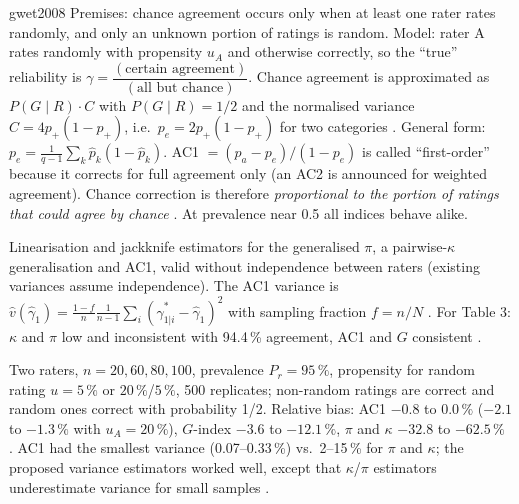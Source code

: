 \begin{papercard}{gwet2008}
 Premises: chance agreement occurs only when at least one rater rates randomly, and only an unknown portion of ratings is random. Model: rater A rates randomly with propensity $u_A$ and otherwise correctly, so the ``true'' reliability is $\gamma=\dfrac{(\text{certain agreement})}{(\text{all but chance})}$. Chance agreement is approximated as $P(G\mid R)\cdot C$ with $P(G\mid R)=1/2$ and the normalised variance $C=4p_+(1-p_+)$, i.e.\ $p_e=2p_+(1-p_+)$ for two categories . General form: $p_e=\frac{1}{q-1}\sum_k \hat p_k(1-\hat p_k)$. AC1 $=(p_a-p_e)/(1-p_e)$ is called ``first-order'' because it corrects for full agreement only (an AC2 is announced for weighted agreement). Chance correction is therefore \emph{proportional to the portion of ratings that could agree by chance} . At prevalence near 0.5 all indices behave alike.

 Linearisation and jackknife estimators for the generalised $\pi$, a pairwise-$\kappa$ generalisation and AC1, valid without independence between raters (existing variances assume independence). The AC1 variance is $\hat v(\hat\gamma_1)=\frac{1-f}{n}\frac{1}{n-1}\sum_i(\hat\gamma^*_{1|i}-\hat\gamma_1)^2$ with sampling fraction $f=n/N$ . For Table 3: $\kappa$ and $\pi$ low and inconsistent with 94.4\,\% agreement, AC1 and $G$ consistent .

 Two raters, $n=20,60,80,100$, prevalence $P_r=95\,\%$, propensity for random rating $u=5\,\%$ or $20\,\%$/$5\,\%$, 500 replicates; non-random ratings are correct and random ones correct with probability 1/2. Relative bias: AC1 $-0.8$ to $0.0\,\%$ ($-2.1$ to $-1.3\,\%$ with $u_A=20\,\%$), $G$-index $-3.6$ to $-12.1\,\%$, $\pi$ and $\kappa$ $-32.8$ to $-62.5\,\%$ . AC1 had the smallest variance (0.07--0.33\,\%) vs.\ 2--15\,\% for $\pi$ and $\kappa$; the proposed variance estimators worked well, except that $\kappa$/$\pi$ estimators underestimate variance for small samples .


\end{papercard}
